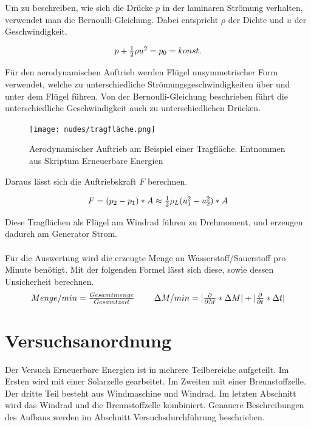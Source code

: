 \documentclass[12pt,a4paper,twoside]{article}
\begin{document}
\noindent
Um zu beschreiben, wie sich die Drücke $p$ in der laminaren Strömung verhalten, verwendet man die Bernoulli-Gleichung. Dabei entspricht $\rho$ der Dichte und $u$ der Geschwindigkeit.  

\begin{equation}
    \label{eq:bernoulli}
    \centerline{$p + \frac{1}{2} \rho u^2 = p_0 = konst. $}
\end{equation}

\noindent
Für den aerodynamischen Auftrieb werden Flügel unsymmetrischer Form verwendet, welche zu unterschiedliche Strömungsgeschwindigkeiten über und unter dem Flügel führen. Von der Bernoulli-Gleichung beschrieben führt die unterschiedliche Geschwindigkeit auch zu unterschiedlichen Drücken. 

\begin{figure}[H]
    \centering
    \texttt{[image: nudes/tragfläche.png]}
    \caption{Aerodynamischer Auftrieb am Beispiel einer Tragfläche. Entnommen aus Skriptum Erneuerbare Energien \cite{teachcenter2}}
    \label{fig:tragfläche}
\end{figure} 

\noindent
Daraus lässt sich die Auftriebskraft $F$ berechnen. 

\begin{equation}
    \label{eq:auftriebskraft}
    \centerline{$F = (p_2 - p_1) * A \approx \frac{1}{2} \rho_L (u_1^2 - u_2^2)*A $}
\end{equation}

\noindent
Diese Tragflächen als Flügel am Windrad führen zu Drehmoment, und erzeugen dadurch am Generator Strom. 
\\
\\
Für die Auswertung wird die erzeugte Menge an Wasserstoff/Sauerstoff pro Minute benötigt. Mit der folgenden Formel lässt sich diese, sowie dessen Unsicherheit berechnen. 
\begin{equation}
    \label{eq:prominute}
    \centerline{$Menge/min = \frac{Gesamtmenge}{Gesamtzeit}$ \\ $\Delta M/min = \vert \frac{\partial }{\partial M} * \Delta M \vert + \vert \frac{\partial }{\partial t} * \Delta t \vert$}
\end{equation}

\section{Versuchsanordnung} %
Der Versuch Erneuerbare Energien ist in mehrere Teilbereiche aufgeteilt. Im Ersten wird mit einer Solarzelle gearbeitet. Im Zweiten mit einer Brennstoffzelle. Der dritte Teil besteht aus Windmaschine und Windrad. 
Im letzten Abschnitt wird das Windrad und die Brennstoffzelle kombiniert. Genauere Beschreibungen des Aufbaus werden im Abschnitt Versuchsdurchführung beschrieben.
\end{document}
